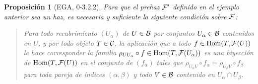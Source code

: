 \documentclass[twoside]{article}
\newtheorem{propo}[defin]{Proposición}
\begin{document}
\begin{propo}[EGA, 0-3.2.2]\label{haztop}
Para que el prehaz $\mathcal{F}'$ definido en el ejemplo anterior sea un haz, es necesaria y suficiente la siguiente condición sobre $\mathcal{F}$:

\begin{verse}


Para todo recubrimiento $(U_{\alpha})$ de $U\in{\mathcal B}$ por conjuntos $U_\alpha\in{\mathcal B}$ contenidos en $U$, y por todo objeto $T\in{\mathcal C}$, la aplicación que a todo $f\in\operatorname{Hom}(T,\mathcal{F}(U))$ le hace corresponder la familia $\rho_{UU_\alpha}\circ f\in\operatorname{Hom}(T,\mathcal{F}(U_\alpha))$ es una biyección de $\operatorname{Hom}(T,\mathcal{F}(U))$ en el conjunto de $(f_\alpha)$ tales que $\rho_{U_\alpha V}\circ f_\alpha=\rho_{U_\beta V}\circ f_\beta$ para toda pareja de índices $(\alpha,\beta)$ y todo $V\in {\mathcal B}$ contenido en $U_\alpha\cap U_\beta$. 
\end{verse}
\end{propo}
\end{document}
